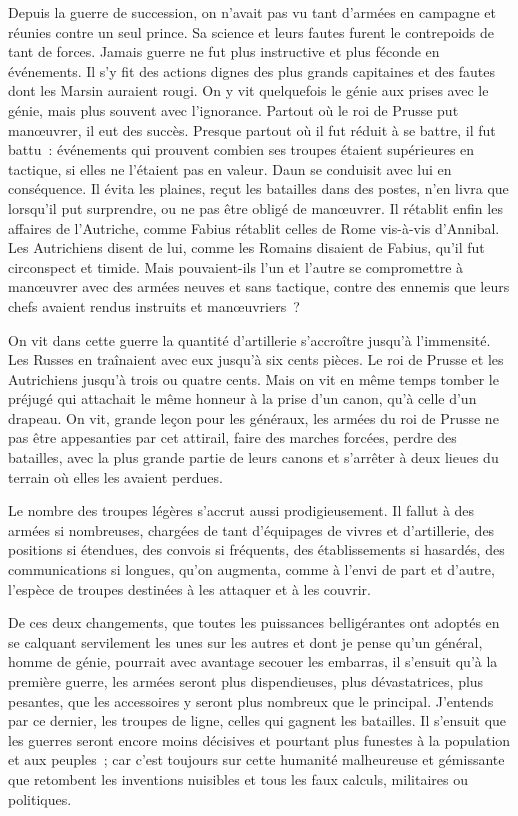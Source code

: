 \documentclass[french,twoside]{book} %
\begin{document}
Depuis la guerre de succession, on n’avait pas vu tant d’armées en campagne et réunies contre un seul prince. Sa science et leurs fautes furent le contrepoids de tant de forces. Jamais guerre ne fut plus instructive et plus féconde en événements. Il s’y fit des actions dignes des plus grands capitaines et des fautes dont les Marsin auraient rougi. On y vit quelquefois le génie aux prises avec le génie, mais plus souvent avec l’ignorance. Partout où le roi de Prusse put manœuvrer, il eut des succès. Presque partout où il fut réduit à se battre, il fut battu : événements qui prouvent combien ses troupes étaient supérieures en tactique, si elles ne l’étaient pas en valeur. Daun se conduisit avec lui en conséquence. Il évita les plaines, reçut les batailles dans des postes, n’en livra que lorsqu’il put surprendre, ou ne pas être obligé de manœuvrer. Il rétablit enfin les affaires de l’Autriche, comme Fabius rétablit celles de Rome vis-à-vis d’Annibal. Les Autrichiens disent de lui, comme les Romains disaient de Fabius, qu’il fut circonspect et timide. Mais pouvaient-ils l’un et l’autre se compromettre à manœuvrer avec des armées neuves et sans tactique, contre des ennemis que leurs chefs avaient rendus instruits et manœuvriers ?\par
On vit dans cette guerre la quantité d’artillerie s’accroître jusqu’à l’immensité. Les Russes en traînaient avec eux jusqu’à six cents pièces. Le roi de Prusse et les Autrichiens jusqu’à trois ou quatre cents. Mais on vit en même temps tomber le préjugé qui attachait le même honneur à la prise d’un canon, qu’à celle d’un drapeau. On vit, grande leçon pour les généraux, les armées du roi de Prusse ne pas être appesanties par cet attirail, faire des marches forcées, perdre des batailles, avec la plus grande partie de leurs canons et s’arrêter à deux lieues du terrain où elles les avaient perdues.\par
Le nombre des troupes légères s’accrut aussi prodigieusement. Il fallut à des armées si nombreuses, chargées de tant d’équipages de vivres et d’artillerie, des positions si étendues, des convois si fréquents, des établissements si hasardés, des communications si longues, qu’on augmenta, comme à l’envi de part et d’autre, l’espèce de troupes destinées à les attaquer et à les couvrir.\par
De ces deux changements, que toutes les puissances belligérantes ont adoptés en se calquant servilement les unes sur les autres et dont je pense qu’un général, homme de génie, pourrait avec avantage secouer les embarras, il s’ensuit qu’à la première guerre, les armées seront plus dispendieuses, plus dévastatrices, plus pesantes, que les accessoires y seront plus nombreux que le principal. J’entends par ce dernier, les troupes de ligne, celles qui gagnent les batailles. Il s’ensuit que les guerres seront encore moins décisives et pourtant plus funestes à la population et aux peuples ; car c’est toujours sur cette humanité malheureuse et gémissante que retombent les inventions nuisibles et tous les faux calculs, militaires ou politiques.\par
\end{document}

